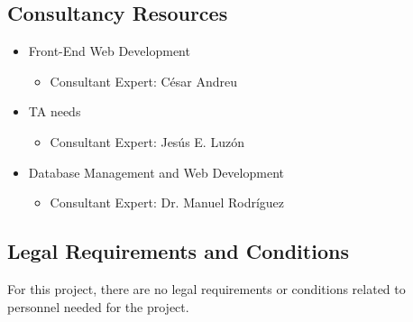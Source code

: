 \subsection{Consultancy Resources}
\begin{itemize}
\item Front-End Web Development
\begin{itemize}
\item Consultant Expert: César Andreu
\end{itemize}
\item TA needs
\begin{itemize}
\item Consultant Expert: Jesús E. Luzón
\end{itemize}
\item Database Management and Web Development
\begin{itemize}
\item Consultant Expert: Dr. Manuel Rodríguez
\end{itemize}
\end{itemize}

\subsection{Legal Requirements and Conditions}
For this project, there are no legal requirements or conditions related to personnel needed for the project.